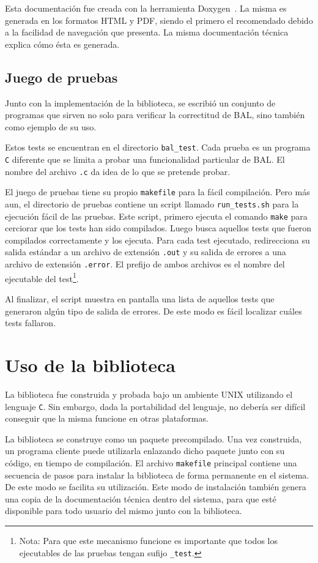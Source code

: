 \documentclass[a4paper,10pt]{article}
\begin{document}
Esta documentación fue creada con la herramienta Doxygen~\cite{doxygen}. La misma es generada en los formatos HTML y PDF, siendo el primero el recomendado debido a la facilidad de navegación que presenta.
 La misma documentación técnica explica cómo ésta es generada.

\subsection{Juego de pruebas}
Junto con la implementación de la biblioteca, se escribió un conjunto de programas que sirven no solo para verificar la correctitud de BAL, sino también como ejemplo de su uso.

Estos tests se encuentran en el directorio \texttt{bal\_test}. Cada prueba es un programa \texttt{C} diferente que se limita a probar una funcionalidad particular de BAL. El nombre del archivo \texttt{.c} da idea de lo que se pretende probar.

El juego de pruebas tiene su propio \texttt{makefile} para la fácil compilación. Pero más aun, el directorio de pruebas contiene un script llamado \texttt{run\_tests.sh} para la ejecución fácil de las pruebas. Este script, primero ejecuta el comando \texttt{make} para cerciorar que los tests han sido compilados. Luego busca aquellos tests que fueron compilados correctamente y los ejecuta. Para cada test ejecutado, redirecciona su salida estándar a un archivo de extensión \texttt{.out} y su salida de errores a una archivo de extensión \texttt{.error}. El prefijo de ambos archivos es el nombre del ejecutable del test\footnote{Nota: Para que este mecanismo funcione es importante que todos los ejecutables de las pruebas tengan sufijo \texttt{\_test}.}.

Al finalizar, el script muestra en pantalla una lista de aquellos tests que generaron algún tipo de salida  de errores. De este modo es fácil localizar cuáles tests fallaron.

\section{Uso de la biblioteca}
\label{sec_uso}
La biblioteca fue construida y probada bajo un ambiente UNIX utilizando el lenguaje \texttt{C}. Sin embargo, dada la portabilidad del lenguaje, no debería ser difícil conseguir que la misma funcione en otras plataformas.

La biblioteca se construye como un paquete precompilado. Una vez construida, un programa cliente puede utilizarla enlazando dicho paquete junto con su código, en tiempo de compilación.
El archivo \texttt{makefile} principal contiene una secuencia de pasos para instalar la biblioteca de forma permanente en el sistema. De este modo se facilita su utilización. Este modo de instalación también genera una copia de la documentación técnica dentro del sistema, para que esté disponible para todo usuario del mismo junto con la biblioteca.
\end{document}

